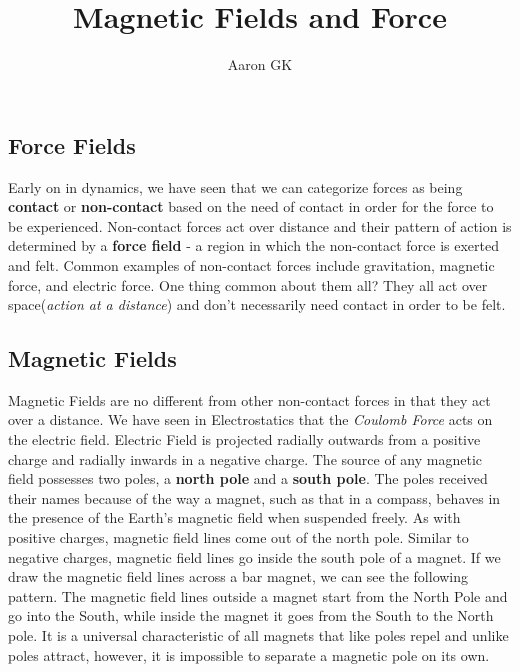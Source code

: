\documentclass[9pt,addpoints]{exam}
\author{Aaron GK}
\title{Magnetic Fields and Force}
\begin{document}
	\maketitle
	\subsection*{Force Fields}
	Early on in dynamics, we have seen that we can categorize forces as being \textbf{contact} or \textbf{non-contact} based on the need of contact in order for the force to be experienced. Non-contact forces act over distance and their pattern of action is determined by a \textbf{force field} - a region in which the non-contact force is exerted and felt.\newline\newline
	Common examples of non-contact forces include gravitation, magnetic force, and electric force. One thing common about them all? They all act over space(\textit{action at a distance}) and don't necessarily need contact in order to be felt. 
	\subsection*{Magnetic Fields}
	Magnetic Fields are no different from other non-contact forces in that they act over a distance. We have seen in Electrostatics that the \textit{Coulomb	Force} acts on the electric field. Electric Field is projected radially outwards from a positive charge and radially inwards in a negative charge. The source of any magnetic field possesses two poles, a \textbf{north pole} and a \textbf{south pole}. The poles received their names because of the way a magnet, such as that in a compass, behaves in the presence of the Earth’s magnetic field when suspended freely. \newline 
	As with positive charges, magnetic field lines come out of the north pole. Similar to negative charges, magnetic field lines go inside the south pole of a magnet. If we draw the magnetic field lines across a bar magnet, we can see the following pattern. \newline
	The magnetic field lines outside a magnet start from the North Pole and go into the South, while inside the magnet it goes from the South to the North pole. It is a universal characteristic of all magnets that like poles repel and unlike poles attract, however, it is impossible to separate a magnetic pole on its own. \newline \newline
\end{document}
